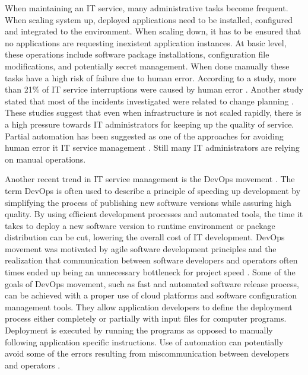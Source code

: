 When maintaining an IT service, many administrative tasks become frequent. When
scaling system up, deployed applications need to be installed, configured and
integrated to the environment. When scaling down, it has to be ensured that no
applications are requesting inexistent application instances. At basic level,
these operations include software package installations, configuration file
modifications, and potentially secret management. When done manually these
tasks have a high risk of failure due to human error. According to a study,
more than 21\% of IT service interruptions were caused by human error
\cite{shwartz2010quality}. Another study stated that most of the incidents
investigated were related to change planning \cite{saarelainen2015quality}.
These studies suggest that even when infrastructure is not scaled rapidly,
there is a high pressure towards IT administrators for keeping up the quality
of service. Partial automation has been suggested as one of the approaches for
avoiding human error it IT service management \cite{shwartz2010quality}. Still
many IT administrators are relying on manual operations.

Another recent trend in IT service management is the DevOps movement
\cite{wiedemann2019devops}. The term DevOps is often used to describe a
principle of speeding up development by simplifying the process of publishing
new software versions while assuring high quality. By using efficient
development processes and automated tools, the time it takes to deploy a new
software version to runtime environment or package distribution can be cut,
lowering the overall cost of IT development. DevOps movement was motivated by
agile software development principles and the realization that communication
between software developers and operators often times ended up being an
unnecessary bottleneck for project speed \cite{ebert2016devops}. Some of the
goals of DevOps movement, such as fast and automated software release process,
can be achieved with a proper use of cloud platforms and software configuration
management tools. They allow application developers to define the deployment
process either completely or partially with input files for computer programs.
Deployment is executed by running the programs as opposed to manually following
application specific instructions. Use of automation can potentially avoid some
of the errors resulting from miscommunication between developers and operators
\cite{ebert2016devops}.

